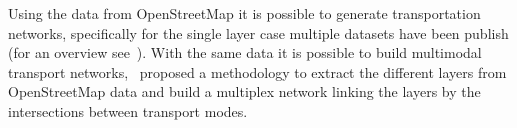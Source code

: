 Using the data from OpenStreetMap it is possible to generate transportation networks, specifically for the single layer case multiple datasets have been publish (for an overview see~\cite{boeing2020multiscale,boeing2020world}). With the same data it is possible to build multimodal transport networks,~\cite{gil2015building} proposed a methodology to extract the different layers from OpenStreetMap data and build a multiplex network linking the layers by the intersections between transport modes. %



